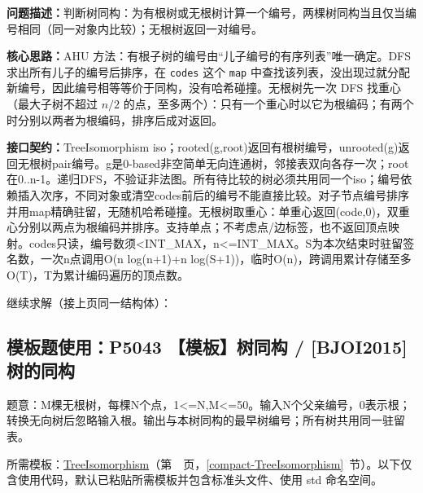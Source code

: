 \noindent\textbf{问题描述：}\allowbreak 判断树同构：为有根树或无根树计算一个编号，两棵树同构当且仅当编号相同（同一对象内比较）；无根树返回一对编号。

\textbf{核心思路：}\allowbreak AHU 方法：有根子树的编号由“儿子编号的有序列表”唯一确定。DFS 求出所有儿子的编号后排序，在 \texttt{codes} 这个 \texttt{map} 中查找该列表，没出现过就分配新编号，因此编号相等等价于同构，没有哈希碰撞。无根树先一次 DFS 找重心（最大子树不超过 $n/2$ 的点，至多两个）：只有一个重心时以它为根编码；有两个时分别以两者为根编码，排序后成对返回。



{\sloppy{}\noindent\textbf{接口契约：}TreeIsomorphism iso；rooted(g,root)返回有根树编号，unrooted(g)返回无根树pair编号。g是0-based非空简单无向连通树，邻接表双向各存一次；root在0..n-1。递归DFS，不验证非法图。所有待比较的树必须共用同一个iso；编号依赖插入次序，不同对象或清空codes前后的编号不能直接比较。对子节点编号排序并用map精确驻留，无随机哈希碰撞。无根树取重心：单重心返回(code,0)，双重心分别以两点为根编码并排序。支持单点；不考虑点/边标签，也不返回顶点映射。codes只读，编号数须<INT\_MAX，n<=INT\_MAX。S为本次结束时驻留签名数，一次n点调用O(n log(n+1)+n log(S+1))，临时O(n)，跨调用累计存储至多O(T)，T为累计编码遍历的顶点数。\par}

\Needspace{321pt}



\newpage

\noindent 继续求解（接上页同一结构体）：



\Needspace{462pt}

\subsection*{模板题使用：P5043 【模板】树同构 / [BJOI2015] 树的同构}

\label{usage-example-357}

题意：M棵无根树，每棵N个点，1<=N,M<=50。输入N个父亲编号，0表示根；转换无向树后忽略输入根。输出与本树同构的最早树编号；所有树共用同一驻留表。

所需模板：\hyperref[compact-TreeIsomorphism]{TreeIsomorphism}（第~\pageref{compact-TreeIsomorphism}~页，\ref{compact-TreeIsomorphism}~节）。以下仅含使用代码，默认已粘贴所需模板并包含标准头文件、使用 std 命名空间。


